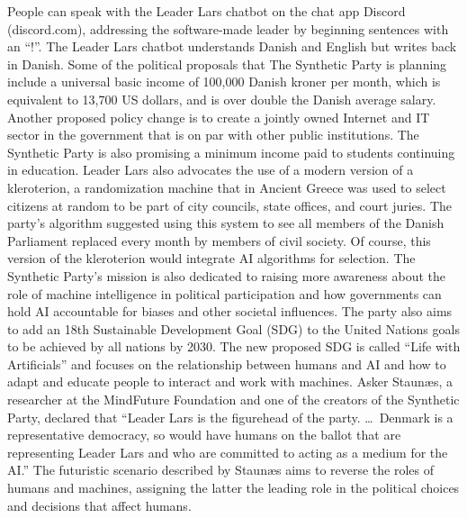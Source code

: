 People can speak with the Leader Lars chatbot on the chat app Discord (discord.com), addressing the software-made leader by beginning sentences with an ``!''. The Leader Lars chatbot understands Danish and English but writes back in Danish. Some of the political proposals that The Synthetic Party is planning include a universal basic income of 100,000 Danish kroner per month, which is equivalent to 13,700 US dollars, and is over double the Danish average salary. Another proposed policy change is to create a jointly owned Internet and IT sector in the government that is on par with other public institutions. The Synthetic Party is also promising a minimum income paid to students continuing in education. Leader Lars also advocates the use of a modern version of a kleroterion, a randomization machine that in Ancient Greece was used to select citizens at random to be part of city councils, state offices, and court juries. The party's algorithm suggested using this system to see all members of the Danish Parliament replaced every month by members of civil society. Of course, this version of the kleroterion would integrate AI algorithms for selection. The Synthetic Party's mission is also dedicated to raising more awareness about the role of machine intelligence in political participation and how governments can hold AI accountable for biases and other societal influences. The party also aims to add an 18th Sustainable Development Goal (SDG) to the United Nations goals to be achieved by all nations by 2030. The new proposed SDG is called ``Life with Artificials'' and focuses on the relationship between humans and AI and how to adapt and educate people to interact and work with machines. Asker Staun{\ae}s, a researcher at the MindFuture Foundation and one of the creators of the Synthetic Party, declared that ``Leader Lars is the figurehead of the party. \dots\ Denmark is a representative democracy, so would have humans on the ballot that are representing Leader Lars and who are committed to acting as a medium for the AI.'' The futuristic scenario described by Staun{\ae}s aims to reverse the roles of humans and machines, assigning the latter the leading role in the political choices and decisions that affect humans.


